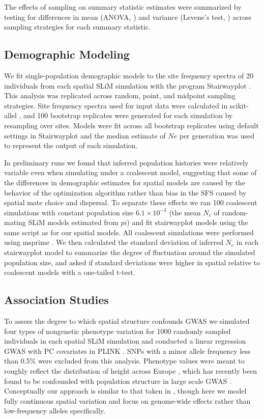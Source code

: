 \documentclass[10pt,twoside,lineno]{gsajnl}
\newif\ifcomments
\newcommand{\ak}[1]{\ifcomments{{\color{red} \it (#1)}}\else{}\fi}
\begin{document}
The effects of sampling on summary statistic estimates were summarized by testing for differences in mean (ANOVA, \citep{Rcore2018}) and variance (Levene's test, \citep{Fox2011}) across sampling strategies for each summary statistic. 

\subsection{Demographic Modeling}
We fit single-population demographic models to the site frequency spectra of 20 individuals from each spatial SLiM simulation with the program Stairwayplot \citep{Liu2015}. This analysis was replicated across random, point, and midpoint sampling strategies. Site frequency spectra used for input data were calculated in scikit-allel \citep{Miles2017}, and 100 bootstrap replicates were generated for each simulation by resampling over sites. Models were fit across all bootstrap replicates using default settings in Stairwayplot and the median estimate of $Ne$ per generation was used to represent the output of each simulation.

In preliminary runs we found that inferred population histories were relatively variable even when simulating under a coalescent model, suggesting that some of the differences in demographic estimates for spatial models are caused by the behavior of the optimization algorithm rather than bias in the SFS caused by spatial mate choice and dispersal. To separate these effects we ran 100 coalescent simulations with constant population size $6.1\times 10^{-3}$ (the mean $N_{e}$ of random-mating SLiM models estimated from $pi$) and fit stairwayplot models using the same script as for our spatial models. All coalescent simulations were performed using msprime \citep{Kelleher2016}. We then calculated the standard deviation of inferred $N_{e}$ in each stairwayplot model to summarize the degree of fluctuation around the simulated population size, and asked if standard deviations were higher in spatial relative to coalescent models with a one-tailed t-test.

\subsection{Association Studies}
To assess the degree to which spatial structure confounds GWAS we simulated four types of nongenetic phenotype variation for 1000 randomly sampled individuals in each spatial SLiM simulation and conducted a linear regression GWAS with PC covariates in PLINK \citep{PURCELL2007}. SNPs with a minor allele frequency less than 0.5\% were excluded from this analysis. Phenotype values were meant to roughly reflect the distribution of height across Europe \ak{how so? need more details here. Was it matched to mean and variance?}, which has recently been found to be confounded with population structure in large scale GWAS \citep{Berg2018,Sohail2018}. Conceptually our approach is similar to that taken in \citep{Mathieson2012}, though here we model fully continuous spatial variation and focus on genome-wide effects rather than low-frequency alleles specifically. 
\end{document}
